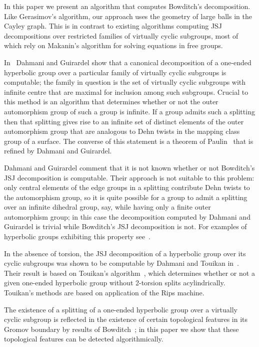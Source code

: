 In this paper we present an algorithm that computes Bowditch's decomposition.
Like Gerasimov's algorithm, our approach uses the geometry of large balls in
the Cayley graph. This is in contrast to existing algorithms computing JSJ
decompositions over restricted families of virtually cyclic subgroups, most of
which rely on Makanin's algorithm for solving equations in free groups.

In~\cite{dahmaniguirardel11} Dahmani and Guirardel show that a canonical
decomposition of a one-ended hyperbolic group over a particular family of
virtually cyclic subgroups is computable; the family in question is the set of
virtually cyclic subgroups with infinite centre that are maximal for inclusion
among such subgroups. Crucial to this method is an algorithm that determines
whether or not the outer automorphism group of such a group is infinite. If a
group admits such a splitting then that splitting gives rise to an infinite set
of distinct elements of the outer automorphism group that are analogous to Dehn
twists in the mapping class group of a surface. The converse of this statement
is a theorem of Paulin~\cite{paulin91} that is refined by Dahmani and
Guirardel.

Dahmani and Guirardel comment that it is not known whether or not Bowditch's JSJ
decomposition is computable. Their approach is not suitable to this problem:
only central elements of the edge groups in a splitting contribute Dehn twists
to the automorphism group, so it is quite possible for a group to admit a
splitting over an infinite dihedral group, say, while having only a finite
outer automorphism group; in this case the decomposition computed by Dahmani
and Guirardel is trivial while Bowditch's JSJ decomposition is not. For
examples of hyperbolic groups exhibiting this property
see~\cite{millerneumannswarup96}. 

In the absence of torsion, the JSJ decomposition of a hyperbolic group over its
cyclic subgroups was shown to be computable by Dahmani and Touikan
in~\cite{dahmanitouikan13}. Their result is based on Touikan's
algorithm~\cite{touikan09}, which determines whether or not a given one-ended
hyperbolic group without 2-torsion splits acylindrically. Touikan's methods are
based on application of the Rips machine.

The existence of a splitting of a one-ended hyperbolic group over a virtually
cyclic subgroup is reflected in the existence of certain topological features
in its Gromov boundary by results of Bowditch~\cite{bowditch98, bowditch99a,
bowditch99b}; in this paper we show that these topological features can be
detected algorithmically.


